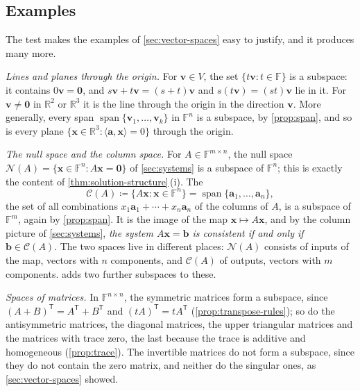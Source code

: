 \subsection{Examples}

The test makes the examples of \cref{sec:vector-spaces} easy to justify, and it produces many more.

\emph{Lines and planes through the origin.} For $\mathbf v\in V$, the set $\{t\mathbf v: t\in\mathbb F\}$ is a subspace: it contains $0\mathbf v=\mathbf 0$, and $s\mathbf v+t\mathbf v=(s+t)\mathbf v$ and $s(t\mathbf v)=(st)\mathbf v$ lie in it. For $\mathbf v\ne\mathbf 0$ in $\mathbb R^2$ or $\mathbb R^3$ it is the line through the origin in the direction $\mathbf v$. More generally, every span $\operatorname{span}\{\mathbf v_1,\ldots,\mathbf v_k\}$ in $\mathbb F^n$ is a subspace, by \cref{prop:span}, and so is every plane $\{\mathbf x\in\mathbb R^3: \langle\mathbf a,\mathbf x\rangle=0\}$ through the origin.

\emph{The null space and the column space.} For $A\in\mathbb F^{m\times n}$, the null space $\mathcal N(A)=\{\mathbf x\in\mathbb F^n: A\mathbf x=\mathbf 0\}$ of \cref{sec:systems} is a subspace of $\mathbb F^n$; this is exactly the content of \cref{thm:solution-structure}\,(i). The 
\[
\mathcal C(A)\coloneqq\{A\mathbf x: \mathbf x\in\mathbb F^n\}=\operatorname{span}\{\mathbf a_1,\ldots,\mathbf a_n\},
\]
the set of all combinations $x_1\mathbf a_1+\cdots+x_n\mathbf a_n$ of the columns of $A$, is a subspace of $\mathbb F^m$, again by \cref{prop:span}. It is the image of the map $\mathbf x\mapsto A\mathbf x$, and by the column picture of \cref{sec:systems}, \emph{the system $A\mathbf x=\mathbf b$ is consistent if and only if $\mathbf b\in\mathcal C(A)$}. The two spaces live in different places: $\mathcal N(A)$ consists of inputs of the map, vectors with $n$ components, and $\mathcal C(A)$ of outputs, vectors with $m$ components.  adds two further subspaces to these.

\emph{Spaces of matrices.} In $\mathbb F^{n\times n}$, the symmetric matrices form a subspace, since $(A+B)^{\mathsf T}=A^{\mathsf T}+B^{\mathsf T}$ and $(tA)^{\mathsf T}=tA^{\mathsf T}$ (\cref{prop:transpose-rules}); so do the antisymmetric matrices, the diagonal matrices, the upper triangular matrices and the matrices with trace zero, the last because the trace is additive and homogeneous (\cref{prop:trace}). The invertible matrices do not form a subspace, since they do not contain the zero matrix, and neither do the singular ones, as \cref{sec:vector-spaces} showed.

